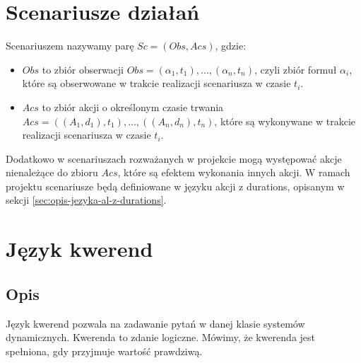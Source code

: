 \documentclass{article}
\begin{document}
\section{Scenariusze działań}
Scenariuszem nazywamy parę $Sc = (Obs, Acs)$, gdzie:
\begin{itemize}
	\item $Obs$ to zbiór obserwacji $Obs = {(\alpha_1, t_1), \ldots, (\alpha_n, t_n)}$, czyli zbiór formuł $\alpha_i$, które są obserwowane w trakcie realizacji scenariusza w czasie $t_i$.
	\item $Acs$ to zbiór akcji o określonym czasie trwania $Acs = {((A_1, d_1), t_1), \ldots, ((A_n, d_n), t_n)}$, które są wykonywane w trakcie realizacji scenariusza w czasie $t_i$.
\end{itemize}

\noindent Dodatkowo w scenariuszach rozważanych w projekcie mogą występować akcje nienależące do zbioru $Acs$, które są efektem wykonania innych akcji. W ramach projektu scenariusze będą definiowane w języku akcji z durations, opisanym w sekcji \ref{sec:opis-jezyka-al-z-durations}.

\section{Język kwerend}

\subsection{Opis}
Język kwerend pozwala na zadawanie pytań w danej klasie systemów dynamicznych. Kwerenda to zdanie logiczne. Mówimy, że kwerenda jest spełniona, gdy przyjmuje wartość prawdziwą.
\end{document}
